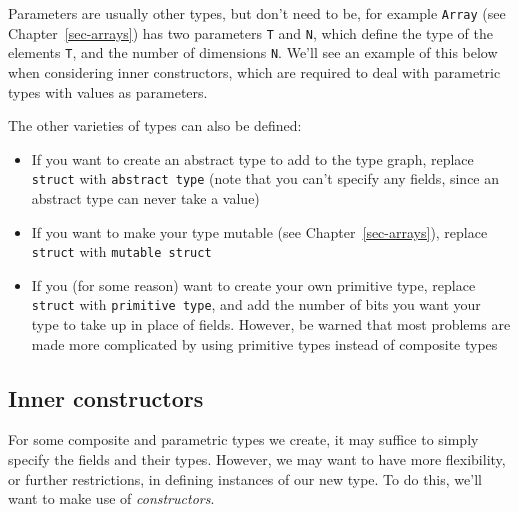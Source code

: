 \documentclass[
  letterpaper,
  DIV=11,
  numbers=noendperiod]{scrreprt}
\begin{document}
Parameters are usually other types, but don't need to be, for example
\texttt{Array} (see Chapter~\ref{sec-arrays}) has two parameters
\texttt{T} and \texttt{N}, which define the type of the elements
\texttt{T}, and the number of dimensions \texttt{N}. We'll see an
example of this below when considering inner constructors, which are
required to deal with parametric types with values as parameters.

\begin{tcolorbox}[enhanced jigsaw, toprule=.15mm, opacitybacktitle=0.6, leftrule=.75mm, breakable, coltitle=black, bottomrule=.15mm, colbacktitle=quarto-callout-note-color!10!white, bottomtitle=1mm, rightrule=.15mm, title=\textcolor{quarto-callout-note-color}{\faInfo}\hspace{0.5em}{Note}, colframe=quarto-callout-note-color-frame, left=2mm, colback=white, opacityback=0, arc=.35mm, toptitle=1mm, titlerule=0mm]

The other varieties of types can also be defined:

\begin{itemize}
\item
  If you want to create an abstract type to add to the type graph,
  replace \texttt{struct} with \texttt{abstract\ type} (note that you
  can't specify any fields, since an abstract type can never take a
  value)
\item
  If you want to make your type mutable (see Chapter~\ref{sec-arrays}),
  replace \texttt{struct} with \texttt{mutable\ struct}
\item
  If you (for some reason) want to create your own primitive type,
  replace \texttt{struct} with \texttt{primitive\ type}, and add the
  number of bits you want your type to take up in place of fields.
  However, be warned that most problems are made more complicated by
  using primitive types instead of composite types
\end{itemize}

\end{tcolorbox}

\hypertarget{inner-constructors}{%
\subsection{Inner constructors}\label{inner-constructors}}

For some composite and parametric types we create, it may suffice to
simply specify the fields and their types. However, we may want to have
more flexibility, or further restrictions, in defining instances of our
new type. To do this, we'll want to make use of \emph{constructors}.
\end{document}
